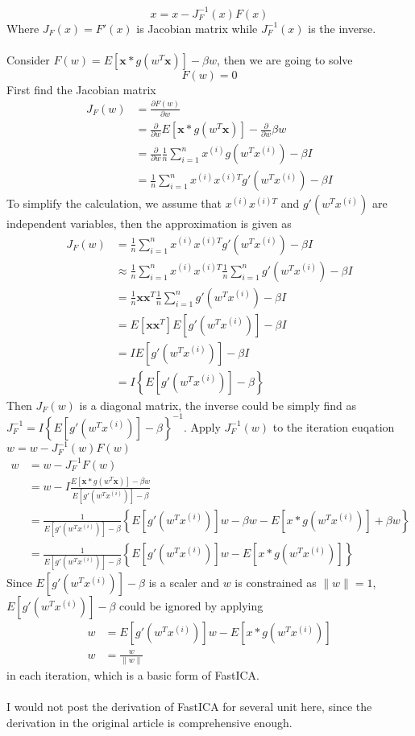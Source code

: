 \documentclass[11pt]{article}
\begin{document}
$$
x = x - J_F^{-1}(x)F(x)
$$
Where $J_F(x) = F'(x)$ is Jacobian matrix while $J_F^{-1}(x)$ is the inverse.\\\\
Consider $F(w) = E\left[\mathbf{x} * g(w^T\mathbf{x})\right] - \beta w$, then we are going to solve
\begin{equation}
    F(w) = 0
\end{equation}
First find the Jacobian matrix
$$
\begin{aligned}
    J_F(w) &= \frac{\partial F(w)}{\partial w}\\
    &= \frac{\partial }{\partial w}E\left[\mathbf{x} * g(w^T\mathbf{x})\right] - 
    \frac{\partial }{\partial w}\beta w\\
    &= \frac{\partial }{\partial w}\frac{1}{n}\sum_{i=1}^n x^{(i)}g(w^Tx^{(i)}) - \beta I\\
    &= \frac{1}{n}\sum_{i=1}^n x^{(i)}x^{(i)T}g'(w^Tx^{(i)}) - \beta I
\end{aligned}
$$
To simplify the calculation, we assume that $x^{(i)}x^{(i)T}$ and $g'(w^Tx^{(i)})$ are independent variables, 
then the approximation is given as
$$
\begin{aligned}
    J_F(w) &= \frac{1}{n}\sum_{i=1}^n x^{(i)}x^{(i)T}g'(w^Tx^{(i)}) - \beta I\\
    &\approx \frac{1}{n}\sum_{i=1}^n x^{(i)}x^{(i)T} \frac{1}{n}\sum_{i=1}^n g'(w^Tx^{(i)}) - \beta I\\
    &= \frac{1}{n}\mathbf{x}\mathbf{x}^T\frac{1}{n}\sum_{i=1}^n g'(w^Tx^{(i)}) - \beta I\\
    &= E[\mathbf{x}\mathbf{x}^T]E[g'(w^Tx^{(i)})] - \beta I\\
    &= IE[g'(w^Tx^{(i)})] - \beta I\\
    &= I\left\{E[g'(w^Tx^{(i)})]-\beta\right\}
\end{aligned}
$$
Then $J_F(w)$ is a diagonal matrix, the inverse could be simply find as $J_F^{-1}=I\left\{E[g'(w^Tx^{(i)})]-\beta\right\}^{-1}$.
Apply $J_F^{-1}(w)$ to the iteration euqation $w = w - J_F^{-1}(w)F(w)$
$$
\begin{aligned}
    w &= w - J_F^{-1}F(w)\\
    &=w - I\frac{E\left[\mathbf{x} * g(w^T\mathbf{x})\right] - \beta w}
    {E[g'(w^Tx^{(i)})]-\beta}\\
    &= \frac{1}{E[g'(w^Tx^{(i)})]-\beta} \left\{ 
        E[g'(w^Tx^{(i)})]w - \beta w - E[x * g(w^Tx^{(i)})] + \beta w
    \right\}\\
    &= \frac{1}{E[g'(w^Tx^{(i)})]-\beta}\left\{ 
        E[g'(w^Tx^{(i)})]w- E[x * g(w^Tx^{(i)})]
    \right\}
\end{aligned}
$$
Since $E[g'(w^Tx^{(i)})]-\beta$ is a scaler and $w$ is constrained as $\|w\|=1$, 
$E[g'(w^Tx^{(i)})]-\beta$ could be ignored by applying
\begin{align}
    w &= E[g'(w^Tx^{(i)})]w- E[x * g(w^Tx^{(i)})]\\
    w &= \frac{w}{\|w\|}
\end{align}
in each iteration, which is a basic form of FastICA. \\\\
I would not post the derivation of FastICA for several unit here, since the derivation in the original
article is comprehensive enough. 

\renewcommand\refname{Reference}
\nocite{1}
\nocite{*} 


\end{document}
